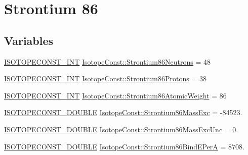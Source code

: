 \hypertarget{group___isotope_const-_strontium-_sr86}{}\section{Strontium 86}
\label{group___isotope_const-_strontium-_sr86}
\subsection*{Variables}
\begin{DoxyCompactItemize}
\item 
\mbox{\hyperlink{group___isotope_const-_macros_ga5f18360b3e99483a35c32d789e62621c}{I\+S\+O\+T\+O\+P\+E\+C\+O\+N\+S\+T\+\_\+\+I\+NT}} \mbox{\hyperlink{group___isotope_const-_strontium-_sr86_ga35dc668ee2cff36ef48bddb7ecc44f17}{Isotope\+Const\+::\+Strontium86\+Neutrons}} = 48
\item 
\mbox{\hyperlink{group___isotope_const-_macros_ga5f18360b3e99483a35c32d789e62621c}{I\+S\+O\+T\+O\+P\+E\+C\+O\+N\+S\+T\+\_\+\+I\+NT}} \mbox{\hyperlink{group___isotope_const-_strontium-_sr86_gab70717191446bddb4560fdc2c8ab2d0a}{Isotope\+Const\+::\+Strontium86\+Protons}} = 38
\item 
\mbox{\hyperlink{group___isotope_const-_macros_ga5f18360b3e99483a35c32d789e62621c}{I\+S\+O\+T\+O\+P\+E\+C\+O\+N\+S\+T\+\_\+\+I\+NT}} \mbox{\hyperlink{group___isotope_const-_strontium-_sr86_ga37c76897f7f0f5f640a81c13bfd253cc}{Isotope\+Const\+::\+Strontium86\+Atomic\+Weight}} = 86
\item 
\mbox{\hyperlink{group___isotope_const-_macros_ga8f45a7272ce02c0b4c65c44636ed719a}{I\+S\+O\+T\+O\+P\+E\+C\+O\+N\+S\+T\+\_\+\+D\+O\+U\+B\+LE}} \mbox{\hyperlink{group___isotope_const-_strontium-_sr86_ga1d3e0e22d82f2bf56264d24613147ced}{Isotope\+Const\+::\+Strontium86\+Mass\+Exc}} = -\/84523.
\item 
\mbox{\hyperlink{group___isotope_const-_macros_ga8f45a7272ce02c0b4c65c44636ed719a}{I\+S\+O\+T\+O\+P\+E\+C\+O\+N\+S\+T\+\_\+\+D\+O\+U\+B\+LE}} \mbox{\hyperlink{group___isotope_const-_strontium-_sr86_gad251e5167dc9f260ab971bf2012469c7}{Isotope\+Const\+::\+Strontium86\+Mass\+Exc\+Unc}} = 0.
\item 
\mbox{\hyperlink{group___isotope_const-_macros_ga8f45a7272ce02c0b4c65c44636ed719a}{I\+S\+O\+T\+O\+P\+E\+C\+O\+N\+S\+T\+\_\+\+D\+O\+U\+B\+LE}} \mbox{\hyperlink{group___isotope_const-_strontium-_sr86_gaa897c5ebdc0b51b6ffcf833521b48148}{Isotope\+Const\+::\+Strontium86\+Bind\+E\+PerA}} = 8708.
\item 

\end{DoxyCompactItemize}
